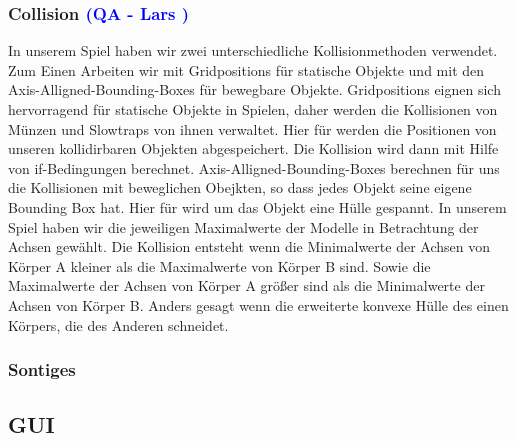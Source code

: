 \documentclass{article}
\begin{document}
\vspace{1cm}
\subsubsection{Collision \textcolor{blue}{(QA - Lars )}}

In unserem Spiel haben wir zwei unterschiedliche Kollisionmethoden verwendet.
Zum Einen Arbeiten wir mit Gridpositions für statische Objekte und mit den
Axis-Alligned-Bounding-Boxes für bewegbare Objekte.\newline
\newline
Gridpositions eignen sich hervorragend für statische Objekte in Spielen, daher werden die Kollisionen
von Münzen und Slowtraps von ihnen verwaltet. Hier für werden die Positionen von unseren kollidirbaren
Objekten abgespeichert. Die Kollision wird dann mit Hilfe von if-Bedingungen berechnet.\newline
\newline
Axis-Alligned-Bounding-Boxes berechnen für uns die Kollisionen mit beweglichen Obejkten, so dass jedes Objekt seine eigene
Bounding Box hat. Hier für wird um das Objekt eine Hülle gespannt. In unserem Spiel haben wir die jeweiligen Maximalwerte
der Modelle in Betrachtung der Achsen gewählt. Die Kollision entsteht wenn die Minimalwerte der Achsen von Körper A kleiner
als die Maximalwerte von Körper B sind. Sowie die Maximalwerte der Achsen von Körper A größer sind als die Minimalwerte der
Achsen von Körper B. Anders gesagt wenn die erweiterte konvexe Hülle des einen Körpers, die des Anderen schneidet.




\vspace{1cm}
\subsubsection{Sontiges}

\vspace{2cm}
\subsection{GUI}
\end{document}
